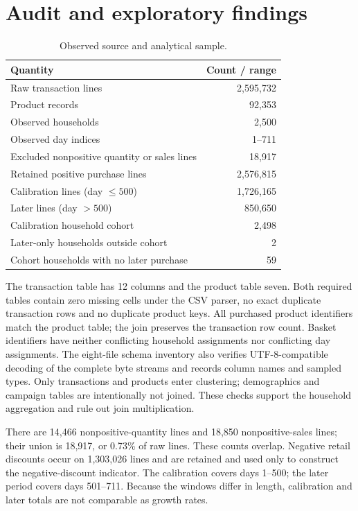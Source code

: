\section{Audit and exploratory findings}
\begin{table}[htbp]\centering
\caption{Observed source and analytical sample.}\label{tab:audit}
\begin{tabular}{lr}\toprule
Quantity & Count / range\\\midrule
Raw transaction lines & 2,595,732\\
Product records & 92,353\\
Observed households & 2,500\\
Observed day indices & 1--711\\
Excluded nonpositive quantity or sales lines & 18,917\\
Retained positive purchase lines & 2,576,815\\
Calibration lines (day $\leq500$) & 1,726,165\\
Later lines (day $>500$) & 850,650\\
Calibration household cohort & 2,498\\
Later-only households outside cohort & 2\\
Cohort households with no later purchase & 59\\\bottomrule
\end{tabular}\end{table}
The transaction table has 12 columns and the product table seven. Both required tables contain zero missing cells under the CSV parser, no exact duplicate transaction rows and no duplicate product keys. All purchased product identifiers match the product table; the join preserves the transaction row count. Basket identifiers have neither conflicting household assignments nor conflicting day assignments. The eight-file schema inventory also verifies UTF-8-compatible decoding of the complete byte streams and records column names and sampled types. Only transactions and products enter clustering; demographics and campaign tables are intentionally not joined. These checks support the household aggregation and rule out join multiplication.

There are 14,466 nonpositive-quantity lines and 18,850 nonpositive-sales lines; their union is 18,917, or 0.73\% of raw lines. These counts overlap. Negative retail discounts occur on 1,303,026 lines and are retained and used only to construct the negative-discount indicator. The calibration covers days 1--500; the later period covers days 501--711. Because the windows differ in length, calibration and later totals are not comparable as growth rates.

